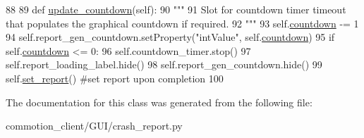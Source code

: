 \begin{DoxyCode}
88 
89     \textcolor{keyword}{def }\hyperlink{classcommotion__client_1_1GUI_1_1crash__report_1_1CrashReport_a04eab1fb6f464494b49a31267f1b48cc}{update\_countdown}(self):
90         \textcolor{stringliteral}{"""}
91 \textcolor{stringliteral}{        Slot for countdown timer timeout that populates the graphical countdown if required.        }
92 \textcolor{stringliteral}{        """}
93         self.\hyperlink{classcommotion__client_1_1GUI_1_1crash__report_1_1CrashReport_ad4c1d4ecb077eb73f8048a6d437db8c5}{countdown} -= 1
94         self.report\_gen\_countdown.setProperty(\textcolor{stringliteral}{"intValue"}, self.\hyperlink{classcommotion__client_1_1GUI_1_1crash__report_1_1CrashReport_ad4c1d4ecb077eb73f8048a6d437db8c5}{countdown})
95         \textcolor{keywordflow}{if} self.\hyperlink{classcommotion__client_1_1GUI_1_1crash__report_1_1CrashReport_ad4c1d4ecb077eb73f8048a6d437db8c5}{countdown} <= 0:
96             self.countdown\_timer.stop()
97             self.report\_loading\_label.hide()
98             self.report\_gen\_countdown.hide()
99             self.\hyperlink{classcommotion__client_1_1GUI_1_1crash__report_1_1CrashReport_ade1514cafdc6eabee38a3f4cc2468411}{set\_report}() \textcolor{comment}{#set report upon completion}
100 

\end{DoxyCode}


The documentation for this class was generated from the following file\+:\begin{DoxyCompactItemize}
\item 
commotion\+\_\+client/\+G\+U\+I/crash\+\_\+report.\+py\end{DoxyCompactItemize}
